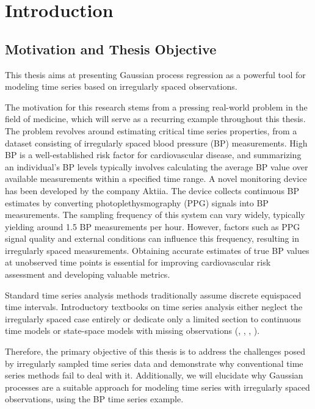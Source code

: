 \chapter{Introduction}\label{ch:introduction}

\section{Motivation and Thesis Objective}\label{sec:thesis-objective}

This thesis aims at presenting Gaussian process regression as a powerful tool for
modeling time series based on irregularly spaced observations.

The motivation for this research stems from a pressing real-world problem in the
field of medicine, which will serve as a recurring example throughout this thesis. 
The problem revolves around estimating critical time series properties,
from a dataset consisting of irregularly spaced blood pressure (BP) measurements.
High BP is a well-established risk factor for cardiovascular disease, and
summarizing an individual's BP levels typically involves calculating the average
BP value over available measurements within a specified time range. A novel
monitoring device has been developed by the company Aktiia.
The device collects continuous BP estimates by
converting photoplethysmography (PPG) signals into BP measurements. 
The sampling frequency of this system can vary widely, typically yielding around
1.5 BP measurements per hour. 
However, factors such as PPG signal quality and external conditions can 
influence this frequency, resulting in irregularly spaced
measurements.
Obtaining accurate estimates of true BP values at unobserved time points is
essential for improving cardiovascular risk assessment and developing valuable
metrics.

Standard time series analysis methods traditionally assume discrete equispaced
time intervals. Introductory textbooks on time series analysis either neglect
the irregularly spaced case entirely or dedicate only a limited section to
continuous time models or state-space models with missing observations (\citeauthor{brockwell_time_1991}, \citeauthor{brockwell_introduction_2016},
\citeauthor{cryer_time_2008}, \citeauthor{chatfield_analysis_2003}).

Therefore, the primary objective of this thesis is to address the challenges
posed by irregularly sampled time series data and demonstrate why conventional
time series methods fail to deal with it. Additionally, we will elucidate why Gaussian
processes are a suitable approach for modeling time series with irregularly
spaced observations, using the BP time series example.

